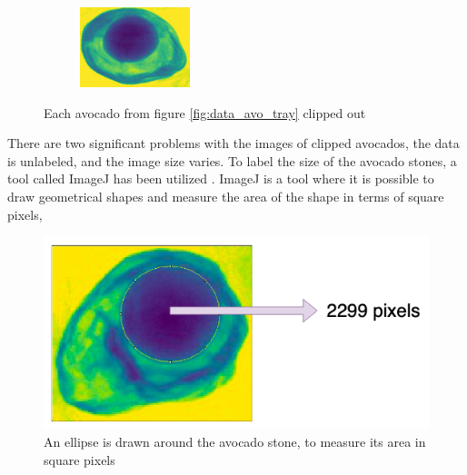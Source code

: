 \documentclass[11pt]{article}
\begin{document}
\begin{figure}[!h]
\begin{subfigure}[b]{0.18\textwidth}
         \caption{}
         \label{fig:data_avo_clip_4}
     \end{subfigure}
          \hfill
     \begin{subfigure}[b]{0.18\textwidth}
         \centering
         \includegraphics[width=\textwidth]{figurer/data/avo0-part4.jpg}
         \caption{}
         \label{fig:data_avo_clip_1}
     \end{subfigure}
    \caption{Each avocado from figure \ref{fig:data_avo_tray} clipped out}
        \label{fig:avo_clipped_data}
\end{figure}
There are two significant problems with the images of clipped avocados, the data is unlabeled, and the image size varies. To label the size of the avocado stones, a tool called ImageJ has been utilized \cite{ImageJ}. ImageJ is a tool where it is possible to draw geometrical shapes and measure the area of the shape in terms of square pixels,
\begin{figure}[!h]
    \centering
    \includegraphics[scale=0.3]{figurer/data/avo_imageJ.png}
    \caption{An ellipse is drawn around the avocado stone, to measure its area in square pixels}
    \label{fig:data_imageJ1}
\end{figure}
\end{document}
